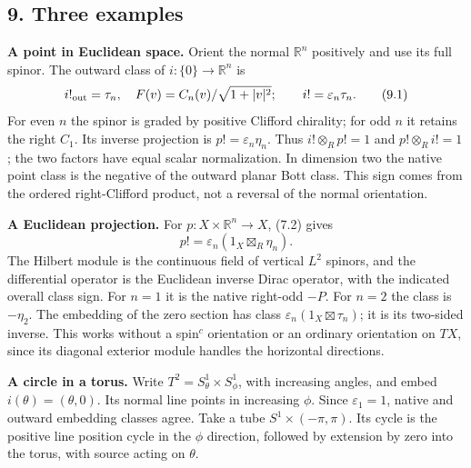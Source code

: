 \documentclass[
  11pt,
]{article}
\begin{document}
\subsection{9. Three examples}\label{three-examples}

\textbf{A point in Euclidean space.} Orient the normal \(\mathbb R^n\)
positively and use its full spinor. The outward class of
\(i:\{0\}\to\mathbb R^n\) is \[
 i!_{\rm out}=\tau_n,
 \quad F(v)=C_n(v)/\sqrt{1+|v|^2};\qquad
 i!=\varepsilon_n\tau_n.
 \tag{9.1}
\] For even \(n\) the spinor is graded by positive Clifford chirality;
for odd \(n\) it retains the right \(C_1\). Its inverse projection is
\(p!=\varepsilon_n\eta_n\). Thus \(i!\otimes_Rp!=1\) and
\(p!\otimes_Ri!=1\); the two factors have equal scalar normalization. In
dimension two the native point class is the negative of the outward
planar Bott class. This sign comes from the ordered right-Clifford
product, not a reversal of the normal orientation.

\textbf{A Euclidean projection.} For \(p:X\times\mathbb R^n\to X\),
(7.2) gives \[
 p!=\varepsilon_n(1_X\boxtimes_R\eta_n).
\] The Hilbert module is the continuous field of vertical \(L^2\)
spinors, and the differential operator is the Euclidean inverse Dirac
operator, with the indicated overall class sign. For \(n=1\) it is the
native right-odd \(-P\). For \(n=2\) the class is \(-\eta_2\). The
embedding of the zero section has class
\(\varepsilon_n(1_X\boxtimes\tau_n)\); it is its two-sided inverse. This
works without a spin\(^{c}\) orientation or an ordinary orientation on
\(TX\), since its diagonal exterior module handles the horizontal
directions.

\textbf{A circle in a torus.} Write \(T^2=S^1_\theta\times S^1_\phi\),
with increasing angles, and embed \(i(\theta)=(\theta,0)\). Its normal
line points in increasing \(\phi\). Since \(\varepsilon_1=1\), native
and outward embedding classes agree. Take a tube
\(S^1\times(-\pi,\pi)\). Its cycle is the positive line position cycle
in the \(\phi\) direction, followed by extension by zero into the torus,
with source acting on \(\theta\).
\end{document}
